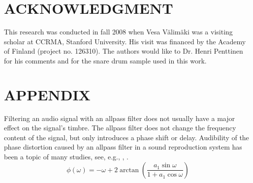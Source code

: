 \documentclass{aes2e}
\begin{document}
\section{ACKNOWLEDGMENT}
This research was conducted in fall 2008 when Vesa V\"alim\"aki was a visiting scholar at CCRMA, Stanford University. His visit was financed by the Academy of Finland (project no. 126310). The authors would like to Dr. Henri Penttinen for his comments and for the snare drum sample used in this work.




%
%
%
%
%
%
%  

\appendix
\section*{APPENDIX}
Filtering an audio signal with an allpass filter does not usually have a major effect on the signal's timbre. The allpass filter does not change the frequency content of the signal, but only introduces a phase shift or delay. Audibility of the phase distortion caused by an allpass filter in a sound reproduction system has been a topic of many studies, see, e.g., \cite{DEK1}, \cite{DEK2}.
\begin{equation}
\phi (\omega ) =  - \omega  + 2\arctan \left( {\frac{{a_1 \sin \omega }}{{1 + a_1 \cos \omega }}} \right)
\end{equation}
\end{document}
